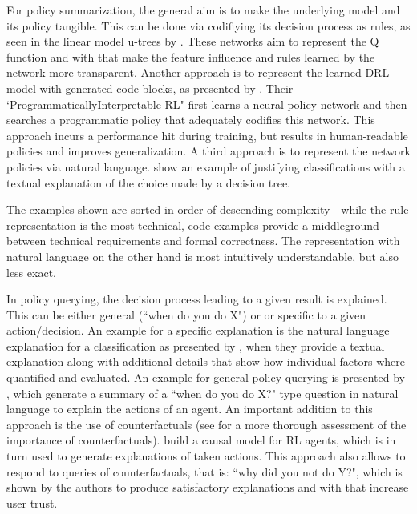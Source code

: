 \documentclass[twoside,11pt]{article}
\begin{document}
For policy summarization, the general aim is to make the underlying model and its policy tangible. This can be done via codifiying its decision process as rules, as seen in the linear model u-trees by \citet{LiuEtAl:2018:LinearModelUTrees}. These networks aim to represent the Q function and with that make the feature influence and rules learned by the network more transparent. 
Another approach is to represent the learned DRL model with generated code blocks, as presented by \citet{VermaEtAl:2018:ProgrammaticallyInterpretableRL}. Their `ProgrammaticallyInterpretable RL" first learns a neural policy network and then searches a programmatic policy that adequately codifies this network. This approach incurs a performance hit during training, but results in human-readable policies and improves generalization.
A third approach is to represent the network policies via natural language. \citet{AlonsoEtAl:2018:xAINLBeerClassifier} show an example of justifying classifications with a textual explanation of the choice made by a decision tree. 

The examples shown are sorted in order of descending complexity - while the rule representation is the most technical, code examples provide a middleground between technical requirements and formal correctness. The representation with natural language on the other hand is most intuitively understandable, but also less exact.

In policy querying, the decision process leading to a given result is explained. This can be either general (``when do you do X") or or specific to a given action/decision.
An example for a specific explanation is the natural language explanation for a classification as presented by \citet{AlonsoEtAl:2018:xAINLBeerClassifier}, when they provide a textual explanation along with additional details that show how individual factors where quantified and evaluated.
An example for general policy querying is presented by \citet{HayesShah:2017:AutonomousPolicyExplanation}, which generate a summary of a ``when do you do X?" type question in natural language to explain the actions of an agent. An important addition to this approach is the use of counterfactuals (see \citet{EvansEtAl:2021:ExplainabilityParadox} for a more thorough assessment of the importance of counterfactuals). \citet{MadumalEtAl:2020:CausalRLCFs} build a causal model for RL agents, which is in turn used to generate explanations of taken actions. This approach also allows to respond to queries of counterfactuals, that is: ``why did you not do Y?", which is shown by the authors to produce satisfactory explanations and with that increase user trust.
\end{document}
